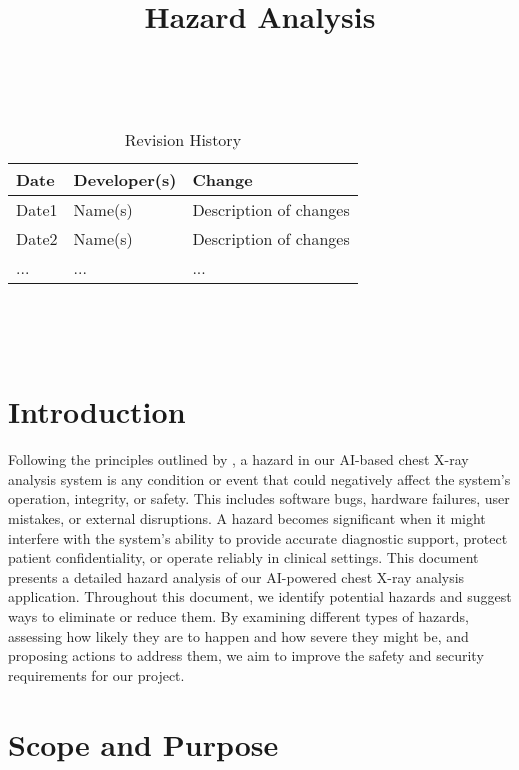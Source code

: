 \documentclass{article}
\title{Hazard Analysis\\\progname}
\author{\authname}
\date{}
\begin{document}
\maketitle
\thispagestyle{empty}

~\newpage


\begin{table}[hp]
\caption{Revision History} \label{TblRevisionHistory}
\begin{tabularx}{\textwidth}{llX}
\toprule
\textbf{Date} & \textbf{Developer(s)} & \textbf{Change}\\
\midrule
Date1 & Name(s) & Description of changes\\
Date2 & Name(s) & Description of changes\\
... & ... & ...\\
\bottomrule
\end{tabularx}
\end{table}

~\newpage

\tableofcontents

~\newpage



\section{Introduction}

Following the principles outlined by \citet{leveson_engineering_2011}, a hazard in our AI-based chest X-ray analysis system is any condition or event that could negatively affect the system's operation, integrity, or safety. This includes software bugs, hardware failures, user mistakes, or external disruptions. A hazard becomes significant when it might interfere with the system's ability to provide accurate diagnostic support, protect patient confidentiality, or operate reliably in clinical settings.
\newline
This document presents a detailed hazard analysis of our AI-powered chest X-ray analysis application. Throughout this document, we identify potential hazards and suggest ways to eliminate or reduce them. By examining different types of hazards, assessing how likely they are to happen and how severe they might be, and proposing actions to address them, we aim to improve the safety and security requirements for our project.

\section{Scope and Purpose}
\end{document}
